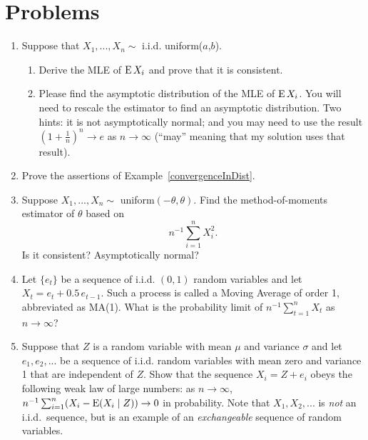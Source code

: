 

\chapter{Problems}

\begin{enumerate}

\item  Suppose that $X_1,...,X_n \sim$ i.i.d. uniform($a$,$b$).
  \begin{enumerate}
  \item Derive the MLE of $\operatorname{E} X_i$ and prove that it is consistent.
  \item Please find the asymptotic distribution of the MLE of $\operatorname{E}
    X_i$.  You will need to rescale the estimator to find an
    asymptotic distribution.  Two hints: it is not asymptotically
    normal; and you may need to use the result $(1 + \tfrac{1}{n})^n \to
    e$ as $n \to \infty$ (``may'' meaning that my solution uses that result).
  \end{enumerate}

\item Prove the assertions of Example~\ref{convergenceInDist}.

\item Suppose $X_1,...,X_n \sim$ uniform$(-\theta, \theta)$.  Find
  the method-of-moments estimator of $\theta$ based on
  \begin{equation*}
    n^{-1} \sum_{i=1}^n X_i^2.
  \end{equation*}
  Is it consistent?  Asymptotically normal?

\item Let $\{e_t\}$ be a sequence of i.i.d. $(0,1)$ random variables
  and let $X_t = e_t + 0.5\, e_{t-1}$.  Such a process is called a
  Moving Average of order 1, abbreviated as MA(1).  What is the
  probability limit of $n^{-1} \sum_{t=1}^n X_t$ as $n \to \infty$?

\item Suppose that $Z$ is a random variable with mean $\mu$ and variance
  $\sigma$ and let $e_1,e_2,...$ be a sequence of i.i.d. random variables with
  mean zero and variance 1 that are independent of $Z$.  Show that the
  sequence $X_i = Z + e_i$ obeys the following weak law of large
  numbers: as $n \to \infty$, $n^{-1} \sum_{i=1}^n ( X_i - \operatorname{E}(X_i \mid Z) ) \to 0$ in
  probability.  Note that $X_1,X_2,...$ is \emph{not} an i.i.d.\ sequence,
  but is an example of an \emph{exchangeable} sequence of random
  variables.


\end{enumerate}
